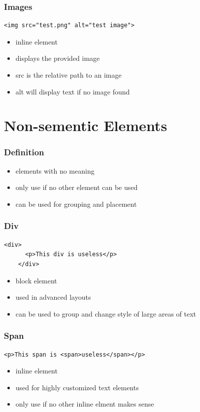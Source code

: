 \documentclass{beamer}
\begin{document}
\begin{frame}[fragile]
  \frametitle{Images}
  \begin{lstlisting}[basicstyle=\footnotesize]
    <img src="test.png" alt="test image">
  \end{lstlisting}
  \begin{itemize}
    \item inline element
    \item displays the provided image
    \item src is the relative path to an image
    \item alt will display text if no image found
  \end{itemize}
\end{frame}

\section[Section]{Non-sementic Elements}

\begin{frame}
  \frametitle{Definition}
  \begin{itemize}
    \item elements with no meaning
    \item only use if no other element can be used
    \item can be used for grouping and placement
  \end{itemize}
\end{frame}

\begin{frame}[fragile]
  \frametitle{Div}
  \begin{lstlisting}[basicstyle=\footnotesize]
    <div>
      <p>This div is useless</p>
    </div>
  \end{lstlisting}
  \begin{itemize}
    \item block element
    \item used in advanced layouts
    \item can be used to group and change style of large areas of text
  \end{itemize}
\end{frame}

\begin{frame}[fragile]
  \frametitle{Span}
  \begin{lstlisting}[basicstyle=\footnotesize]
    <p>This span is <span>useless</span></p>
  \end{lstlisting}
  \begin{itemize}
    \item inline element
    \item used for highly customized text elements
    \item only use if no other inline elment makes sense
  \end{itemize}
\end{frame}
\end{document}
